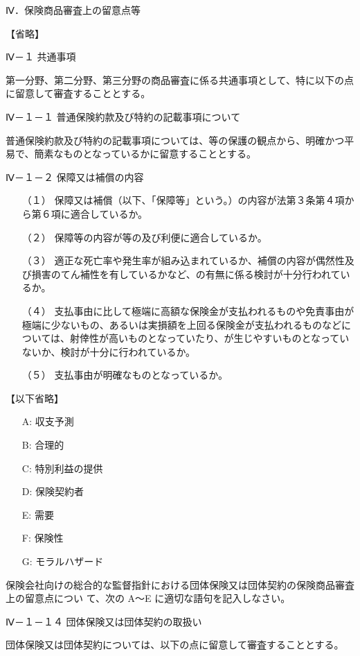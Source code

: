 \documentclass[report,gutter=10mm,fore-edge=10mm,uplatex,dvipdfmx]{jlreq}
\begin{document}
Ⅳ．保険商品審査上の留意点等

【省略】

Ⅳ－１ 共通事項

第一分野、第二分野、第三分野の商品審査に係る共通事項として、特に以下の点に留意して審査することとする。

Ⅳ－１－１ 普通保険約款及び特約の記載事項について

普通保険約款及び特約の記載事項については、等の保護の観点から、明確かつ平易で、簡素なものとなっているかに留意することとする。

Ⅳ－１－２ 保障又は補償の内容

\begin{itemize}
\item[ （１） ] 保障又は補償（以下、「保障等」という。）の内容が法第３条第４項から第６項に適合しているか。
\item[ （２） ] 保障等の内容が等の及び利便に適合しているか。
\item[ （３） ] 適正な死亡率や発生率が組み込まれているか、補償の内容が偶然性及び損害のてん補性を有しているかなど、の有無に係る検討が十分行われているか。
\item[ （４） ] 支払事由に比して極端に高額な保険金が支払われるものや免責事由が極端に少ないもの、あるいは実損額を上回る保険金が支払われるものなどについては、射倖性が高いものとなっていたり、が生じやすいものとなっていないか、検討が十分に行われているか。
\item[ （５） ] 支払事由が明確なものとなっているか。
\end{itemize}
【以下省略】
\answer{}
\begin{itemize}
\item[ A: ] 収支予測
\item[ B: ] 合理的
\item[ C: ] 特別利益の提供
\item[ D: ] 保険契約者
\item[ E: ] 需要
\item[ F: ] 保険性
\item[ G: ] モラルハザード
\end{itemize}

保険会社向けの総合的な監督指針における団体保険又は団体契約の保険商品審査上の留意点につい
て、次の A～E に適切な語句を記入しなさい。

Ⅳ－１－１４ 団体保険又は団体契約の取扱い

団体保険又は団体契約については、以下の点に留意して審査することとする。
\end{document}
